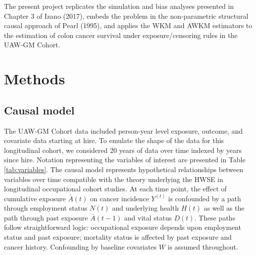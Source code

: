 \documentclass[
  11pt,
]{article}
\begin{document}
The present project replicates the simulation and bias analyses
presented in Chapter 3 of Izano (2017), embeds the problem in the
non-parametric structural causal approach of Pearl (1995), and applies
the WKM and AWKM estimators to the estimation of colon cancer survival
under exposure/censoring rules in the UAW-GM Cohort.

\hypertarget{methods}{%
\section{Methods}\label{methods}}

\hypertarget{causal-model}{%
\subsection{Causal model}\label{causal-model}}

The UAW-GM Cohort data included person-year level exposure, outcome, and
covariate data starting at hire. To emulate the shape of the data for
this longitudinal cohort, we considered 20 years of data over time
indexed by years since hire. Notation representing the variables of
interest are presented in Table \ref{tab:variables}. The causal model
represents hypothetical relationships between variables over time
compatible with the theory underlying the HWSE in longitudinal
occupational cohort studies. At each time point, the effect of
cumulative exposure \(\bar A(t)\) on cancer incidence \(Y^(t)\) is
confounded by a path through employment status \(N(t)\) and underlying
health \(H(t)\) as well as the path through past exposure
\(\bar A(t - 1)\) and vital status \(D(t)\). These paths follow
straightforward logic: occupational exposure depends upon employment
status and past exposure; mortality status is affected by past exposure
and cancer history. Confounding by baseline covariates \(W\) is assumed
throughout.
\end{document}
